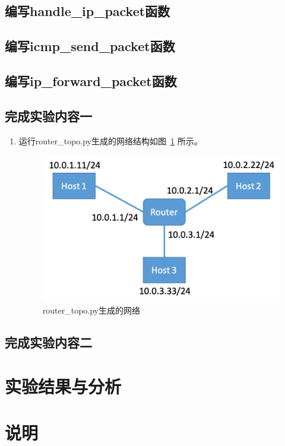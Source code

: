 \documentclass{zjureport}
\begin{document}
  \subsection{编写handle\_ip\_packet函数}
    

  \newpage
  \subsection{编写icmp\_send\_packet函数}
    

  \subsection{编写ip\_forward\_packet函数}
    

  \newpage
  \subsection{完成实验内容一}
      \begin{enumerate}
          \item 运行router\_topo.py生成的网络结构如图~\ref{fig:rtpy} 所示。
                \begin{figure}[!htbp]
                    \centering
                    \includegraphics[width=0.7\linewidth]{figures/rtpy.png}
                    \caption{router\_topo.py生成的网络}
                    \label{fig:rtpy}
                \end{figure}

      \end{enumerate}

  \subsection{完成实验内容二}


\section{实验结果与分析}

\section{说明}
\end{document}
